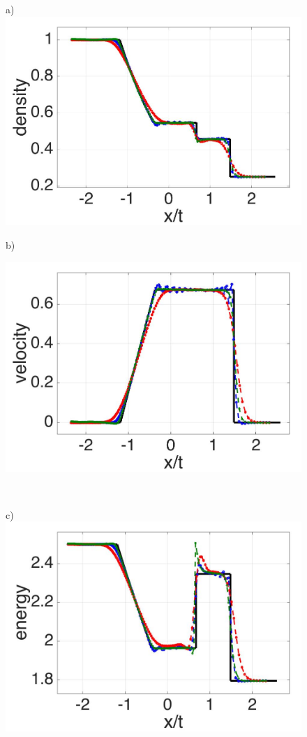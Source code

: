 \documentclass[preprint,12pt,authoryear]{elsarticle}
\begin{document}
\begin{figure}[H]
    \centering
    \begin{minipage}{.45\textwidth}
        \centering a)
        \includegraphics[width=0.99 \textwidth,height=0.6\textwidth]{./Figures/RCM-Sod-GSPH2-compare-rho}
    \end{minipage}%
    \begin{minipage}{.545\textwidth}
    \centering b)
        \begin{flushleft}
        \includegraphics[width= 0.8174 \textwidth, height=0.4954 \textwidth]{./Figures/RCM-Sod-GSPH2-compare-v}    
        \end{flushleft}
    \end{minipage}%
    \\
    \begin{minipage}{.45\textwidth}
        \centering c)
        \includegraphics[width=0.99 \textwidth,height=0.6\textwidth]{./Figures/RCM-Sod-GSPH2-compare-e}

\end{minipage}
\end{figure}
\end{document}

